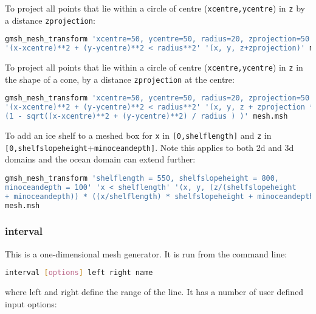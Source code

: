 To project all points that lie within a circle of centre (\lstinline[language = Bash]+xcentre,ycentre+) in \lstinline[language = Bash]+z+ by a distance \lstinline[language = Bash]+zprojection+:
\begin{lstlisting}[language = Bash]
gmsh_mesh_transform 'xcentre=50, ycentre=50, radius=20, zprojection=50'
'(x-xcentre)**2 + (y-ycentre)**2 < radius**2' '(x, y, z+zprojection)' mesh.msh
\end{lstlisting} 

To project all points that lie within a circle of centre (\lstinline[language = Bash]+xcentre,ycentre+) in \lstinline[language = Bash]+z+ in the shape of a cone, by a distance \lstinline[language = Bash]+zprojection+ at the centre:
\begin{lstlisting}[language = Bash]
gmsh_mesh_transform 'xcentre=50, ycentre=50, radius=20, zprojection=50'
'(x-xcentre)**2 + (y-ycentre)**2 < radius**2' '(x, y, z + zprojection *
(1 - sqrt((x-xcentre)**2 + (y-ycentre)**2) / radius ) )' mesh.msh
\end{lstlisting} 

To add an ice shelf to a meshed box for \lstinline[language = Bash]+x+ in \lstinline[language = Bash]+[0,shelflength]+ and \lstinline[language = Bash]+z+ in \lstinline[language = Bash]+[0,shelfslopeheight++\lstinline[language = Bash]+minoceandepth]+. Note this applies to both 2d and 3d domains and the ocean domain can extend further:
\begin{lstlisting}[language = Bash]
gmsh_mesh_transform 'shelflength = 550, shelfslopeheight = 800, 
minoceandepth = 100' 'x < shelflength' '(x, y, (z/(shelfslopeheight 
+ minoceandepth)) * ((x/shelflength) * shelfslopeheight + minoceandepth))' 
mesh.msh
\end{lstlisting}


\subsubsection{interval}
\label{sec:interval}

This is a one-dimensional mesh generator. It is run from the command line:
\begin{lstlisting}[language = Bash]
interval [options] left right name 
\end{lstlisting}
where left and right define the range of the line. It has a number of user defined input options:

